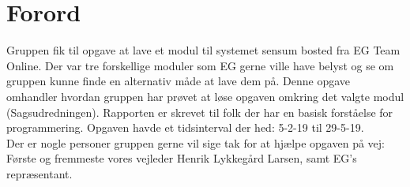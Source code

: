 \chapter{Forord}
Gruppen fik til opgave at lave et modul til systemet sensum bosted fra EG Team Online. Der var tre forskellige moduler som EG gerne ville have belyst og se om gruppen kunne finde en alternativ måde at lave dem på. Denne opgave omhandler hvordan gruppen har prøvet at løse opgaven omkring det valgte modul (Sagsudredningen). Rapporten er skrevet til folk der har en basisk forståelse for programmering. Opgaven havde et tidsinterval der hed: 5-2-19 til 29-5-19. \\
Der er nogle personer gruppen gerne vil sige tak for at hjælpe opgaven på vej:\\
Første og fremmeste vores vejleder Henrik Lykkegård Larsen, samt EG’s repræsentant.  \\
